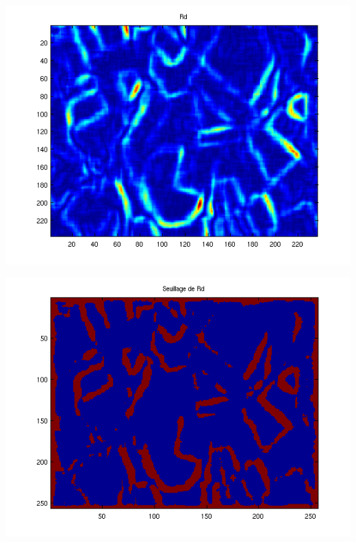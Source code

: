 \documentclass{beamer}
\begin{document}
\begin{frame}
\begin{center}
\includegraphics[scale=0.6]{capture4/partie4_07.png}
\end{center}
\end{frame}

\begin{frame}
\begin{center}
\includegraphics[scale=0.6]{capture4/partie4_08.png}
\end{center}
\end{frame}
\end{document}
